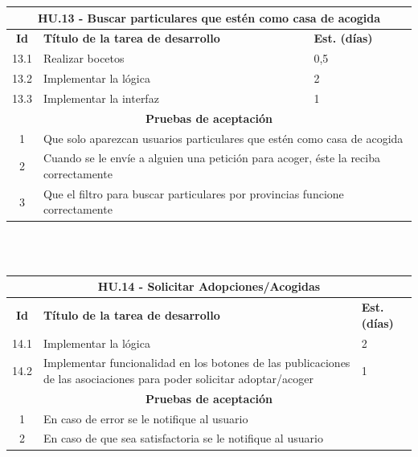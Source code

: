 \begin{tabular}{|c|p{9.5cm}|p{1cm}|}
	\hline
	\multicolumn{3}{|p{12.5cm}|}{\textbf{HU.13 - Buscar particulares que estén como casa de acogida}} \\
	\hline
	\textbf{Id} & \textbf{Título de la tarea de desarrollo} & \textbf{Est. (días)} \\
	\hline
	13.1 & Realizar bocetos & 0,5 \\ \hline
	13.2 &  Implementar la lógica & 2 \\ \hline
	13.3 &  Implementar la interfaz & 1 \\ \hline
	\multicolumn{3}{|c|}{\textbf{Pruebas de aceptación}} \\ \hline
	1 & \multicolumn{2}{|p{12cm}|}{Que solo aparezcan usuarios particulares que estén como casa de acogida} \\ \hline
	2 & \multicolumn{2}{|p{12cm}|}{Cuando se le envíe a alguien una petición para acoger, éste la reciba correctamente} \\ \hline
	3 & \multicolumn{2}{|p{12cm}|}{Que el filtro para buscar particulares por provincias funcione correctamente} \\ \hline
	
\end{tabular} \\ \\

\begin{tabular}{|c|p{9.5cm}|p{1cm}|}
	\hline
	\multicolumn{3}{|c|}{\textbf{HU.14 - Solicitar Adopciones/Acogidas}} \\
	\hline
	\textbf{Id} & \textbf{Título de la tarea de desarrollo} & \textbf{Est. (días)} \\
	\hline
	14.1 &  Implementar la lógica & 2 \\ \hline
	14.2 &  Implementar funcionalidad en los botones de las publicaciones de las asociaciones para poder solicitar adoptar/acoger & 1 \\ \hline
	\multicolumn{3}{|c|}{\textbf{Pruebas de aceptación}} \\ \hline
	1 & \multicolumn{2}{|p{12cm}|}{En caso de error se le notifique al usuario} \\ \hline
	2 & \multicolumn{2}{|p{12cm}|}{En caso de que sea satisfactoria se le notifique al usuario} \\ \hline
	
\end{tabular} \\ \\

